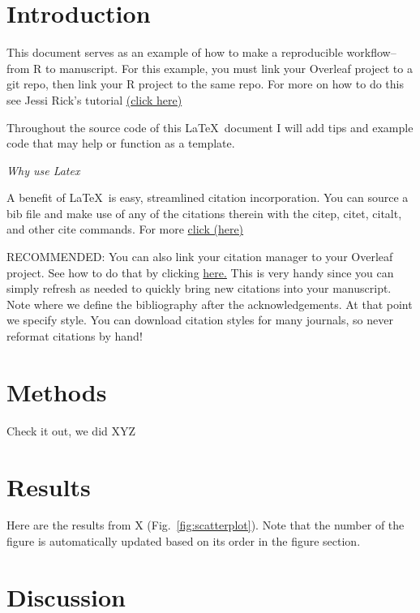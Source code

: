 \documentclass[letterpaper, 12pt]{article}
\begin{document}
\begin{linenumbers} %
\section{Introduction}
This document serves as an example of how to make a reproducible workflow--from R to manuscript. 
For this example, you must link your Overleaf project to a git repo, then link your R project to the same repo. For more on how to do this see Jessi Rick's tutorial \href{https://github.com/jessicarick/resources}{(click here)}

Throughout the source code of this \LaTeX\ document I will add tips and example code that may help or function as a template.

\begin{center}
    \emph{Why use Latex}
\end{center}

A benefit of \LaTeX\  is easy, streamlined citation incorporation. You can source a bib file and make use of any of the citations therein with the citep, citet, citalt, and other cite commands. For more \href{https://www.imperial.ac.uk/media/imperial-college/administration-and-support-services/library/public/LaTeX-and-BibTeX-branded-jan-2016.pdf}{click (here)}

RECOMMENDED: You can also link your citation manager to your Overleaf project. See how to do that by clicking \href{https://www.overleaf.com/learn/latex/Bibliography_management_with_bibtex}{here.} This is very handy since you can simply refresh as needed to quickly bring new citations into your manuscript. Note where we define the bibliography after the acknowledgements. At that point we specify style. You can download citation styles for many journals, so never reformat citations by hand!

\section{Methods}
Check it out, we did XYZ

\section{Results}
Here are the results from X (Fig.~\ref{fig:scatterplot}). Note that the number of the figure is automatically updated based on its order in the figure section.

\section{Discussion}


\end{linenumbers}
\end{document}
